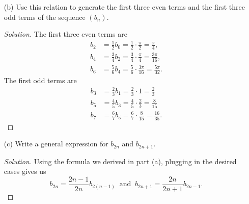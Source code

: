 \begin{enumerate}
\begin{proof}
\begin{align*}
        \end{align*}
        Hence, we end up with 
        \begin{align*}  \int_{ 0 }^{ \frac{ \pi }{ 2 }  }  \sin^{n}(x) \  dx &=  \int_{ 0 }^{ \frac{ \pi }{ 2 }   } (n-1) \sin^{n-2}(x)  \   dx + \int_{ 0 }^{ \frac{ \pi }{ 2 }  } (n-1) \sin^{n}(x) \  dx. \tag{1}  \\
        \end{align*}
        Finally, subtracting the second term on the right side of (1), simplifying, and dividing by \( n  \) on both sides gives us our desired result
        \begin{align*}
            b_{n}  &= \int_{ 0 }^{ \frac{ \pi }{ 2 }  }  \sin^{n}(x) \ dx \\ &= \frac{ n-1 }{ n } \int_{ 0 }^{ \frac{ \pi }{ 2 }  } \sin^{n-2}(x) \ dx \\
                                                                &= \frac{ n-1 }{ n } b_{n-2}.
        \end{align*}
        \end{proof}
    \item[(b)] Use this relation to generate the first three even terms and the first three odd terms of the sequence \( (b_{n}) \).
        \begin{proof}[Solution]
        The first three even terms are 
		\begin{align*}
		    b_{2} &= \frac{ 1 }{ 2 }  b_{0} = \frac{ 1 }{ 2 } \cdot \frac{ \pi }{ 2 } = \frac{ \pi }{ 4 },  \\
			b_{4} &= \frac{ 3 }{ 4 } b_{2} = \frac{ 3 }{ 4 }  \cdot \frac{ \pi }{ 4 }  = \frac{ 3 \pi   }{ 16 }, \\
			b_{6} &= \frac{ 5 }{ 6 } b_{4} = \frac{ 5 }{ 6 } \cdot \frac{ 3 \pi }{ 16 } = \frac{ 5 \pi }{ 32 }. 
		\end{align*}
		The first odd terms are 
		\begin{align*}
		    b_{3} &= \frac{ 2 }{ 3 }  b_{1} = \frac{ 2 }{ 3 } \cdot 1 = \frac{ 2 }{ 3 }    \\
			b_{5} &= \frac{ 4 }{ 5 } b_{3} = \frac{ 4 }{ 5 }  \cdot \frac{ 2 }{ 3 } = \frac{ 8 }{ 15 }  \\
			b_{7} &= \frac{ 6 }{ 7 }  b_{5} = \frac{ 6 }{ 7 }  \cdot \frac{ 8 }{ 15 }  = \frac{ 16 }{ 35 }.
		\end{align*}
        \end{proof}
    \item[(c)] Write a general expression for \( b_{2n} \) and \( b_{2n+1}  \).
        \begin{proof}[Solution]
        Using the formula we derived in part (a), plugging in the desired cases gives us
        \[  b_{2n} = \frac{ 2n -1  }{ 2n  }  b_{2(n-1)} \ \text{ and } \  b_{2n+1} = \frac{ 2n }{ 2n+1 } b_{2n-1}.  \]

        \end{proof}
\end{enumerate}

